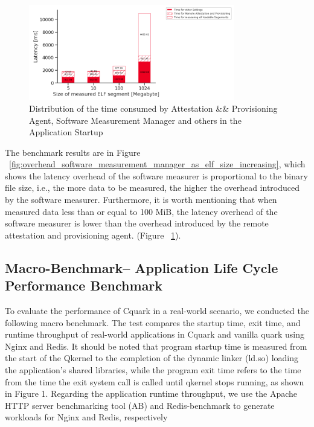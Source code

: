 \begin{figure}[H]
    \centering
    \includegraphics[width=0.8\textwidth]{images/startup_time_change_as_elf_size_increasing.PNG}
    \caption[Distribution of the time consumed by Attestation \&\& Provisioning Agent, Software Measurement Manager and others in the Application Startup]{Distribution of the time consumed by Attestation \&\& Provisioning Agent, Software Measurement Manager and others in the Application Startup}
    \label{fig:startup_time_change_as_elf_size_increasing}
\end{figure}



The benchmark results are in Figure ~\ref{fig:overhead_software_measurement_manager_as_elf_size_increasing}, which shows the latency overhead of the software measurer is proportional to the binary file size, i.e., the more data to be measured, the higher the overhead introduced by the software measurer. Furthermore, it is worth mentioning that when measured 
data less than or equal to 100 MiB, the latency overhead of the software measurer is lower than the overhead introduced by the remote attestation and provisioning agent. (Figure ~\ref{fig:startup_time_change_as_elf_size_increasing}).



\subsection{Macro-Benchmark– Application Life Cycle Performance Benchmark}

To evaluate the performance of Cquark in a real-world scenario, we conducted the following macro benchmark. The test compares the startup time, exit time, and runtime throughput of real-world applications in Cquark and vanilla quark using Nginx and Redis. It should be noted that program startup time 
is measured from the start of the Qkernel to the completion of the dynamic linker (ld.so) loading the application's shared libraries, while the program exit time refers to the time from the time the exit system call is called until qkernel stops running, as shown in Figure 1. Regarding the application 
runtime throughput, we use the Apache HTTP server benchmarking tool (AB) and Redis-benchmark to generate workloads for Nginx and Redis, respectively


